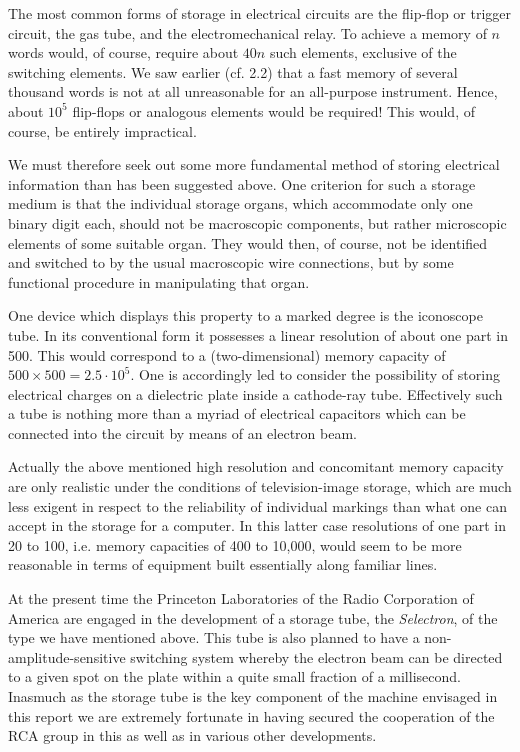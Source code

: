 \documentclass[12pt]{amsart}
\begin{document}
The most common forms of storage in electrical circuits are the flip-flop or trigger circuit, the gas tube, and the electromechanical relay. To achieve a memory of $n$ words would, of course, require about $40n$ such elements, exclusive of the switching elements. We saw earlier (cf. 2.2) that a fast memory of several thousand words is not at all unreasonable for an all-purpose instrument. Hence, about $10^5$ flip-flops or analogous elements would be required! This would, of course, be entirely impractical.

We must therefore seek out some more fundamental method of storing electrical information than has been suggested above. One criterion for such a storage medium is that the individual storage organs, which accommodate only one binary digit each, should not be macroscopic components, but rather microscopic elements of some suitable organ. They would then, of course, not be identified and switched to by the usual macroscopic wire connections, but by some functional procedure in manipulating that organ.

One device which displays this property to a marked degree is the iconoscope tube. In its conventional form it possesses a linear resolution of about one part in 500. This would correspond to a (two-dimensional) memory capacity of $500 \times 500 = 2.5 \cdot 10^5$. One is accordingly led to consider the possibility of storing electrical charges on a dielectric plate inside a cathode-ray tube. Effectively such a tube is nothing more than a myriad of electrical capacitors which can be connected into the circuit by means of an electron beam.

Actually the above mentioned high resolution and concomitant memory capacity are only realistic under the conditions of television-image storage, which are much less exigent in respect to the reliability of individual markings than what one can accept in the storage for a computer. In this latter case resolutions of one part in 20 to 100, i.e. memory capacities of 400 to 10,000, would seem to be more reasonable in terms of equipment built essentially along familiar lines.

At the present time the Princeton Laboratories of the Radio Corporation of America are engaged in the development of a storage tube, the \emph{Selectron}, of the type we have mentioned above. This tube is also planned to have a non-amplitude-sensitive switching system whereby the electron beam can be directed to a given spot on the plate within a quite small fraction of a millisecond. Inasmuch as the storage tube is the key component of the machine envisaged in this report we are extremely fortunate in having secured the cooperation of the RCA group in this as well as in various other developments.
\end{document}
